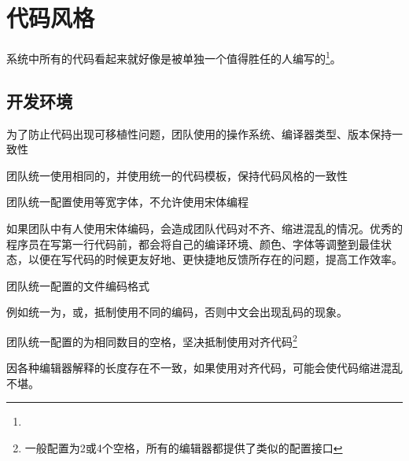 \begin{savequote}[45mm]
\end{savequote}

\chapter{代码风格} 
\label{ch:physical-design}

\begin{content}

系统中所有的代码看起来就好像是被单独一个值得胜任的人编写的\footnote{}。

\end{content}

\section{开发环境}

\begin{content}

\begin{regulation}
为了防止代码出现可移植性问题，团队使用的操作系统、编译器类型、版本保持一致性
\end{regulation}

\begin{regulation}
团队统一使用相同的，并使用统一的代码模板，保持代码风格的一致性
\end{regulation}

\begin{regulation}
团队统一配置使用等宽字体，不允许使用宋体编程
\end{regulation}

如果团队中有人使用宋体编码，会造成团队代码对不齐、缩进混乱的情况。优秀的程序员在写第一行代码前，都会将自己的编译环境、颜色、字体等调整到最佳状态，以便在写代码的时候更友好地、更快捷地反馈所存在的问题，提高工作效率。

\begin{regulation}
团队统一配置的文件编码格式
\end{regulation}

例如统一为，或，抵制使用不同的编码，否则中文会出现乱码的现象。

\begin{regulation}
团队统一配置的为相同数目的空格，坚决抵制使用对齐代码\footnote{一般配置为2或4个空格，所有的编辑器都提供了类似的配置接口}
\end{regulation}

因各种编辑器解释的长度存在不一致，如果使用对齐代码，可能会使代码缩进混乱不堪。

\end{content}

